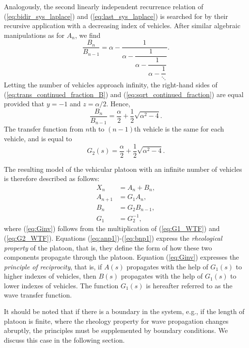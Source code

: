 \documentclass[final,5p,times,twocolumn]{elsarticle}
\begin{document}
Analogously, the second linearly independent recurrence relation of (\ref{eq:bidir_sys_laplace}) and (\ref{eq:last_sys_laplace}) is searched for by their recursive application with a decreasing index of vehicles. After similar algebraic manipulations as for $A_n$, we find
\begin{equation}
  \dfrac{B_n}{B_{n-1}} = \alpha- \dfrac{1}{\alpha-\dfrac{1}{\alpha-\dfrac{1}{\alpha-\dfrac{1}{\ddots}}}}.
  \label{eq:trans_continued_fraction_B}
\end{equation}
Letting the number of vehicles approach infinity, the right-hand sides of (\ref{eq:trans_continued_fraction_B}) and (\ref{eq:sqrt_continued_fraction}) are equal provided that $y=-1$ and $z=\alpha/2$. Hence,
\begin{equation}
  \frac{B_n}{B_{n-1}} = \frac{\alpha}{2}+\frac{1}{2}\sqrt{\alpha^2-4}.
  \label{eq:G2_continued_fraction}
\end{equation}
The transfer function from $n$th to $(n-1)$th vehicle is the same for each vehicle, and is equal to
\begin{equation}
  G_2(s) = \frac{\alpha}{2}+\frac{1}{2}\sqrt{\alpha^2-4}. \label{eq:G2_WTF}
\end{equation}

The resulting model of the vehicular platoon with an infinite number of vehicles is therefore described as follows:
\begin{align}
  X_n &= A_n + B_n,
  \label{eq:pos_decomp}\\
  A_{n+1} &= G_1A_n,
  \label{eq:anp1}\\
  B_{n} &= G_2B_{n-1},
  \label{eq:bnp1}\\
  G_1 &= G_2^{-1},
  \label{eq:Ginv}
\end{align}
where (\ref{eq:Ginv}) follows from the multiplication of (\ref{eq:G1_WTF}) and (\ref{eq:G2_WTF}). Equations (\ref{eq:anp1})-(\ref{eq:bnp1}) express the \emph{rheological property} of the platoon, that is, they define the form of how these two components propagate through the platoon. Equation (\ref{eq:Ginv}) expresses the \emph{principle of reciprocity}, that is, if $A(s)$ propagates with the help of $G_1(s)$ to higher indexes of vehicles, then $B(s)$ propagates with the help of $G_1(s)$ to lower indexes of vehicles. The function $G_1(s)$ is hereafter referred to as the wave transfer function.

It should be noted that if there is a boundary in the system, e.g., if the length of platoon is finite, where the rheology property for wave propagation changes abruptly, the principles must be supplemented by boundary conditions. We discuss this case in the following section.
\end{document}
